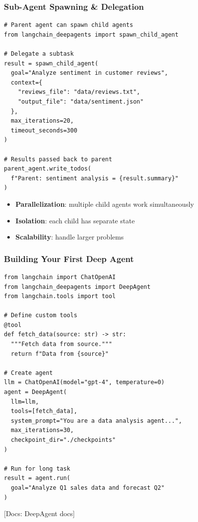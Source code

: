 \documentclass[aspectratio=169,11pt]{beamer}
\newcommand{\docref}[1]{{\scriptsize\color{docgray}[Docs: #1]}}
\begin{document}
\begin{frame}[fragile]
\frametitle{Sub-Agent Spawning \& Delegation}

\begin{lstlisting}
# Parent agent can spawn child agents
from langchain_deepagents import spawn_child_agent

# Delegate a subtask
result = spawn_child_agent(
  goal="Analyze sentiment in customer reviews",
  context={
    "reviews_file": "data/reviews.txt",
    "output_file": "data/sentiment.json"
  },
  max_iterations=20,
  timeout_seconds=300
)

# Results passed back to parent
parent_agent.write_todos(
  f"Parent: sentiment analysis = {result.summary}"
)
\end{lstlisting}

\begin{tipbox}[Benefits]
\begin{itemize}
    \setlength{\itemsep}{1pt}
  \item \textbf{Parallelization}: multiple child agents work simultaneously
  \item \textbf{Isolation}: each child has separate state
  \item \textbf{Scalability}: handle larger problems
\end{itemize}
\end{tipbox}

\end{frame}

\begin{frame}[fragile]
\frametitle{Building Your First Deep Agent}

\begin{lstlisting}
from langchain import ChatOpenAI
from langchain_deepagents import DeepAgent
from langchain.tools import tool

# Define custom tools
@tool
def fetch_data(source: str) -> str:
  """Fetch data from source."""
  return f"Data from {source}"

# Create agent
llm = ChatOpenAI(model="gpt-4", temperature=0)
agent = DeepAgent(
  llm=llm,
  tools=[fetch_data],
  system_prompt="You are a data analysis agent...",
  max_iterations=30,
  checkpoint_dir="./checkpoints"
)

# Run for long task
result = agent.run(
  goal="Analyze Q1 sales data and forecast Q2"
)
\end{lstlisting}

\docref{DeepAgent docs}

\end{frame}
\end{document}
